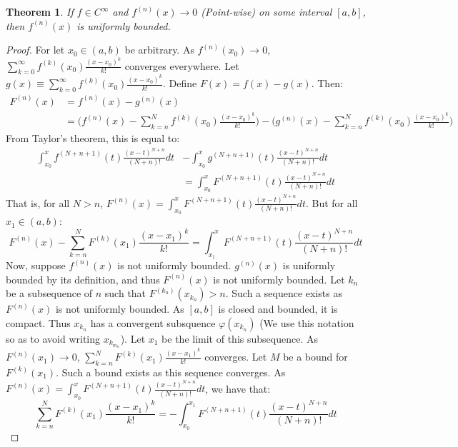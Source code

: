 \documentclass[oneside]{book}
\theoremstyle{mystyle}
\newtheorem{theorem}{Theorem}[section]
\begin{document}
\begin{theorem}
If $f\in C^{\infty}$ and $f^{(n)}(x)\rightarrow 0$ (Point-wise) on some interval $[a,b]$, then $f^{(n)}(x)$ is uniformly bounded.
\end{theorem}
\begin{proof}
For let $x_0\in (a,b)$ be arbitrary. As $f^{(n)}(x_0)\rightarrow 0$, $\sum_{k=0}^{\infty} f^{(k)}(x_0)\frac{(x-x_0)^{k}}{k!}$ converges everywhere. Let $g(x)\equiv \sum_{k=0}^{\infty} f^{(k)}(x_0)\frac{(x-x_0)^{k}}{k!}$. Define $F(x) = f(x)-g(x)$. Then:
\begin{align*}
    F^{(n)}(x) &= f^{(n)}(x)-g^{(n)}(x)\\
    &= \bigg(f^{(n)}(x)-\sum_{k=n}^{N} f^{(k)}(x_0)\frac{(x-x_0)^{k}}{k!}\bigg)-\bigg(g^{(n)}(x)-\sum_{k=n}^{N} f^{(k)}(x_0)\frac{(x-x_0)^{k}}{k!}\bigg)    
\end{align*}
%
From Taylor's theorem, this is equal to:
%
\begin{align*}
    \int_{x_0}^{x} f^{(N+n+1)}(t)\frac{(x-t)^{N+n}}{(N+n)!}dt &- \int_{x_0}^{x} g^{(N+n+1)}(t)\frac{(x-t)^{N+n}}{(N+n)!}dt\\
    &= \int_{x_0}^{x} F^{(N+n+1)}(t)\frac{(x-t)^{N+n}}{(N+n)!}dt    
\end{align*}
%
That is, for all $N>n$, $F^{(n)}(x) = \int_{x_0}^{x} F^{(N+n+1)}(t)\frac{(x-t)^{N+n}}{(N+n)!}dt$. But for all $x_1 \in (a,b)$:
%
\begin{equation*}
    F^{(n)}(x)-\sum_{k=n}^{N} F^{(k)}(x_1)\frac{(x-x_1)^k}{k!} = \int_{x_1}^{x} F^{(N+n+1)}(t)\frac{(x-t)^{N+n}}{(N+n)!}dt    
\end{equation*}
%
Now, suppose $f^{(n)}(x)$ is not uniformly bounded. $g^{(n)}(x)$ is uniformly bounded by its definition, and thus $F^{(n)}(x)$ is not uniformly bounded. Let ${k_n}$ be a subsequence of $n$ such that $F^{(k_n)}(x_{k_n})>n$. Such a sequence exists as $F^{(n)}(x)$ is not uniformly bounded. As $[a,b]$ is closed and bounded, it is compact. Thus $x_{k_n}$ has a convergent subsquence $\varphi(x_{k_n})$ (We use this notation so as to avoid writing $x_{k_{m_n}}$). Let $x_1$ be the limit of this subsequence. As $F^{(n)}(x_1)\rightarrow 0$, $\sum_{k=n}^{N} F^{(k)}(x_1)\frac{(x-x_1)^k}{k!}$ converges. Let $M$ be a bound for $F^{(k)}(x_1)$. Such a bound exists as this sequence converges. As $F^{(n)}(x) = \int_{x_0}^{x} F^{(N+n+1)}(t)\frac{(x-t)^{N+n}}{(N+n)!}dt$, we have that:
%
\begin{equation*}
    \sum_{k=n}^{N} F^{(k)}(x_1)\frac{(x-x_1)^k}{k!} = -\int_{x_0}^{x_1} F^{(N+n+1)}(t)\frac{(x-t)^{N+n}}{(N+n)!}dt    

\end{equation*}
\end{proof}
\end{document}
